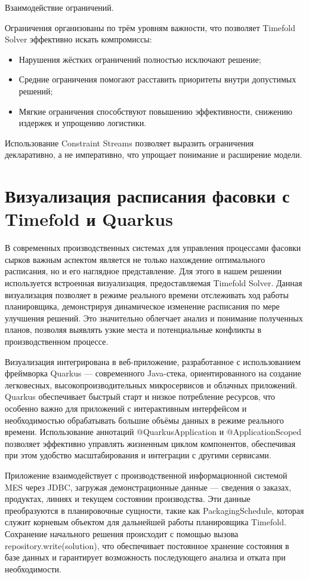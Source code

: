  Взаимодействие ограничений.

Ограничения организованы по трём уровням важности, что позволяет Timefold Solver эффективно искать компромиссы:

\begin{itemize}
    \item Нарушения жёстких ограничений полностью исключают решение;
    \item Средние ограничения помогают расставить приоритеты внутри допустимых решений;
    \item Мягкие ограничения способствуют повышению эффективности, снижению издержек и упрощению логистики.
\end{itemize}

Использование Constraint Streams позволяет выразить ограничения декларативно, а не императивно, что упрощает понимание и расширение модели.
\section{Визуализация расписания фасовки с Timefold и Quarkus}

В современных производственных системах для управления процессами фасовки сырков важным аспектом является не только нахождение оптимального расписания, но и его наглядное представление. Для этого в нашем решении используется встроенная визуализация, предоставляемая Timefold Solver. Данная визуализация позволяет в режиме реального времени отслеживать ход работы планировщика, демонстрируя динамическое изменение расписания по мере улучшения решений. Это значительно облегчает анализ и понимание полученных планов, позволяя выявлять узкие места и потенциальные конфликты в производственном процессе.

Визуализация интегрирована в веб-приложение, разработанное с использованием фреймворка Quarkus — современного Java-стека, ориентированного на создание легковесных, высокопроизводительных микросервисов и облачных приложений. Quarkus обеспечивает быстрый старт и низкое потребление ресурсов, что особенно важно для приложений с интерактивным интерфейсом и необходимостью обрабатывать большие объёмы данных в режиме реального времени. Использование аннотаций @QuarkusApplication и @ApplicationScoped позволяет эффективно управлять жизненным циклом компонентов, обеспечивая при этом удобство масштабирования и интеграции с другими сервисами.

Приложение взаимодействует с производственной информационной системой MES через JDBC, загружая демонстрационные данные — сведения о заказах, продуктах, линиях и текущем состоянии производства. Эти данные преобразуются в планировочные сущности, такие как PackagingSchedule, которая служит корневым объектом для дальнейшей работы планировщика Timefold. Сохранение начального решения происходит с помощью вызова repository.write(solution), что обеспечивает постоянное хранение состояния в базе данных и гарантирует возможность последующего анализа и отката при необходимости.


